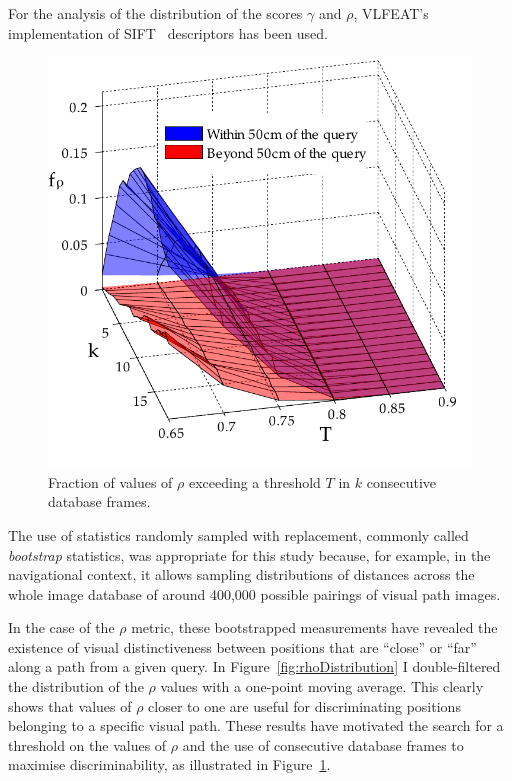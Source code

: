 
For the analysis of the distribution of the scores $\gamma$ and $\rho$, VLFEAT's~\cite{Vedaldi2008} implementation of SIFT~\cite{lowe2004distinctive} descriptors has been used.

\begin{figure}
\begin{center}
\includegraphics[width=.8\linewidth]{./gfx/Chapter02/C1twoTestWithBootstrapping2.pdf}
\caption{Fraction of values of $\rho$ exceeding a threshold $T$ in $k$ consecutive database frames.}
\label{fig:rocTwoParametersC5}
\end{center}
\end{figure}

The use of statistics randomly sampled with replacement, commonly called \textit{bootstrap} statistics, was appropriate for this study because, for example, in the navigational context, it allows sampling distributions of distances across the whole image database of around 400,000 possible pairings of visual path images.

In the case of the $\rho$ metric, these bootstrapped measurements have revealed the existence of visual distinctiveness between positions that are ``close'' or ``far'' along a path from a given query. In Figure~\ref{fig:rhoDistribution} I double-filtered the distribution of the $\rho$ values with a one-point moving average. This clearly shows that values of $\rho$ closer to one are useful for discriminating positions belonging to a specific visual path. These results have motivated the search for a threshold on the values of $\rho$ and the use of consecutive database frames to maximise discriminability, as illustrated in Figure~\ref{fig:rocTwoParametersC5}.


